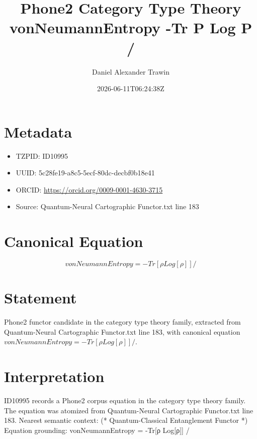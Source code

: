 \documentclass[11pt]{article}
\title{Phone2 Category Type Theory vonNeumannEntropy -Tr Ρ Log Ρ /}
\author{Daniel Alexander Trawin}
\date{2026-06-11T06:24:38Z}
\begin{document}
\maketitle
\section*{Metadata}
\begin{itemize}
\item TZPID: ID10995
\item UUID: 5c28fe19-a8c5-5ecf-80dc-decbf0b18e41
\item ORCID: \url{https://orcid.org/0009-0001-4630-3715}
\item Source: Quantum-Neural Cartographic Functor.txt line 183
\end{itemize}
\section*{Canonical Equation}
\[
vonNeumannEntropy = -Tr[ρ Log[ρ]] /
\]
\section*{Statement}
Phone2 functor candidate in the category type theory family, extracted from Quantum-Neural Cartographic Functor.txt line 183, with canonical equation $vonNeumannEntropy = -Tr[ρ Log[ρ]] /$.
\section*{Interpretation}
ID10995 records a Phone2 corpus equation in the category type theory family. The equation was atomized from Quantum-Neural Cartographic Functor.txt line 183. Nearest semantic context: (* Quantum-Classical Entanglement Functor *) Equation grounding: vonNeumannEntropy = -Tr[ρ Log[ρ]] /
\end{document}
